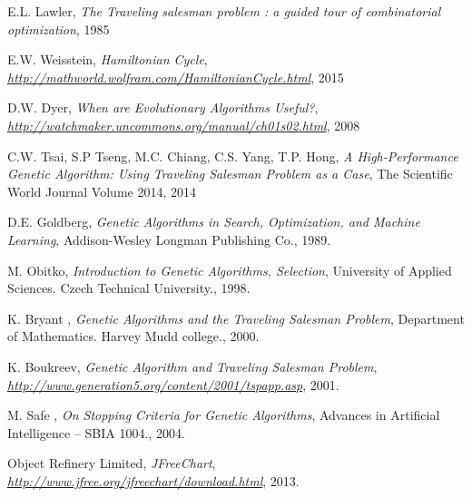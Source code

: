 \documentclass[article]{IEEEtran}
\begin{document}
\begin{thebibliography}{9}

E.L. Lawler, \textit{The Traveling salesman problem : a guided tour of combinatorial optimization},
1985

E.W. Weisstein, \textit{Hamiltonian Cycle},
\textit{\url{http://mathworld.wolfram.com/HamiltonianCycle.html}}, 2015

D.W. Dyer, \textit{When are Evolutionary Algorithms Useful?},
\textit{\url{http://watchmaker.uncommons.org/manual/ch01s02.html}}, 2008

C.W. Tsai, S.P Tseng, M.C. Chiang, C.S. Yang, T.P. Hong, \textit{A High-Performance Genetic Algorithm: Using Traveling Salesman Problem as a Case},
The Scientific World Journal Volume 2014, 2014

D.E. Goldberg, \textit{Genetic Algorithms in Search, Optimization, and Machine Learning},
Addison-Wesley Longman Publishing Co., 1989. 

M. Obitko, \textit{Introduction to Genetic Algorithms, Selection},
University of Applied Sciences. Czech Technical University., 1998. 

K. Bryant , \textit{Genetic Algorithms and the Traveling Salesman Problem},
Department of Mathematics. Harvey Mudd college., 2000. 

K. Boukreev, \textit{Genetic Algorithm and Traveling Salesman Problem},
\textit{\url{http://www.generation5.org/content/2001/tspapp.asp}}, 2001.

M. Safe , \textit{On Stopping Criteria for Genetic Algorithms},
Advances in Artificial Intelligence – SBIA 1004., 2004. 

Object Refinery Limited, \textit{JFreeChart},
\textit{\url{http://www.jfree.org/jfreechart/download.html}}, 2013.

\end{thebibliography}
\end{document}
